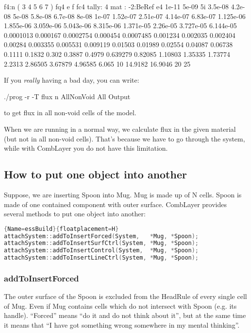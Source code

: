 \begin{mcnp}
f4:n ( 3 4 5 6 7 )
fq4   e f
fc4 tally: 4 mat : -2:BeRef
e4    1e-11 5e-09 5i 3.5e-08 4.2e-08 5e-08 5.8e-08 6.7e-08 8e-08 1e-07
        1.52e-07 2.51e-07 4.14e-07 6.83e-07 1.125e-06 1.855e-06
        3.059e-06 5.043e-06 8.315e-06 1.371e-05 2.26e-05 3.727e-05
        6.144e-05 0.0001013 0.000167 0.0002754 0.000454 0.0007485
        0.001234 0.002035 0.002404 0.00284 0.003355 0.005531 0.009119
        0.01503 0.01989 0.02554 0.04087 0.06738 0.1111 0.1832 0.302
        0.3887 0.4979 0.639279 0.82085 1.10803 1.35335 1.73774 2.2313
        2.86505 3.67879 4.96585 6.065 10 14.9182 16.9046 20 25
\end{mcnp}

If you {\em really} having a bad day, you can write:
\begin{bash}
./prog -r -T flux n AllNonVoid All Output
\end{bash}
to get flux in all non-void cells of the model.

When we are running \cinder in a normal way, we calculate flux in the given material (but not in all non-void cells).
That's because we have to go through the \cinder system, while with CombLayer you do not have this limitation.


\subsection{How to put one object into another}

Suppose, we are inserting Spoon into Mug.
Mug is made up of N cells. Spoon is made of one contained component with outer surface.
CombLayer provides several methods to put one object into another:

\begin{lstlisting}[language=C++]{Name=essBuild}{floatplacement=H}
attachSystem::addToInsertForced(System,   *Mug, *Spoon);
attachSystem::addToInsertSurfCtrl(System, *Mug, *Spoon);
attachSystem::addToInsertControl(System,  *Mug, *Spoon);
attachSystem::addToInsertLineCtrl(System, *Mug, *Spoon);
\end{lstlisting}

\subsubsection{addToInsertForced}
The outer surface of the Spoon is excluded from the HeadRule of every single cell of Mug.
Even if Mug contains cells which do not intersect with Spoon (e.g. its handle).
``Forced'' means ``do it and do not think about it'', but at the same time it means that ``I have got something wrong somewhere in my mental thinking''.

